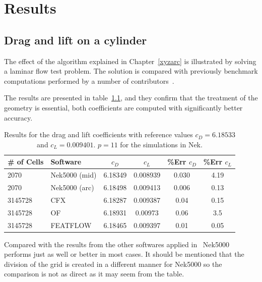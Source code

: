
\chapter{Results} %

\label{results} %



\section{Drag and lift on a cylinder}
The effect of the algorithm explained in Chapter~\ref{xyzarc} is
illustrated by solving a laminar flow test problem. 
The solution is compared with previously benchmark computations performed by a number of 
contributors~\cite{benchmark}. 

The results are presented in table~\ref{tab:testcase}, and they confirm that the treatment of the geometry is 
essential, both coefficients are computed with significantly better accuracy. 
%
\begin{table}
\centering
\begin{tabular}{l l c c c c}
		\toprule
		\# of Cells & Software & $c_D$ & $c_L$ & \%\textbf{Err} $c_D$ &\%\textbf{Err} $c_L$ \\ \midrule 
		2070 & Nek5000 (mid) & 6.18349 & 0.008939 & 0.030 & 4.19 \\ 
		2070 & Nek5000 (arc) & 6.18498 & 0.009413 & 0.006 & 0.13 \\
		3145728 & CFX 		 & 6.18287 & 0.009387 & 0.04 &0.15 \\
		3145728 & OF	     & 6.18931 & 0.00973 & 0.06 &3.5 \\
		3145728 & FEATFLOW   & 6.18465 & 0.009397 & 0.01 &0.05 \\
		\bottomrule	
	\end{tabular}
	\caption{Results for the drag and lift coefficients with reference values 
	$c_D = 6.18533$ and $c_L = 0.009401$. $p=11$ for the simulations in Nek.}
\label{tab:testcase}
\end{table}
%
Compared with the results from the other softwares applied in~\cite{benchmark} Nek5000 performs 
just as well or better in most cases. It should be mentioned that the division of the grid is created
in a different manner for Nek5000 so the comparison is not as direct as it may seem from the table.


